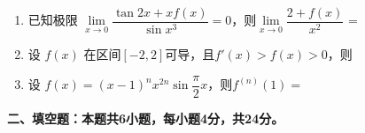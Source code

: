 \documentclass[a4paper,12pt]{article}
\begin{document}
\begin{enumerate}
    \item 已知极限 \( \underset{x \to 0}{\lim} \dfrac{\tan{2x}+xf(x)}{\sin{x^3}}=0 \)，则\( \underset{x \to 0}{\lim}\dfrac{2+f(x)}{x^2} \) = 
    \begin{multicols}{4}
    \end{multicols}


    \item 设 \( f(x) \) 在区间$[-2,2]$可导，且\( f'(x) > f(x) > 0 \)，则 
    \begin{multicols}{4}
    \end{multicols}

    \item 设 $f(x)=(x-1)^n x^{2n} \sin{\dfrac{\pi}{2}x}$，则$f^{(n)}(1)=$
    \begin{multicols}{4}
    \end{multicols}


\end{enumerate}



\newpage

\noindent
\textbf{二、填空题：本题共6小题，每小题4分，共24分。}
\end{document}
